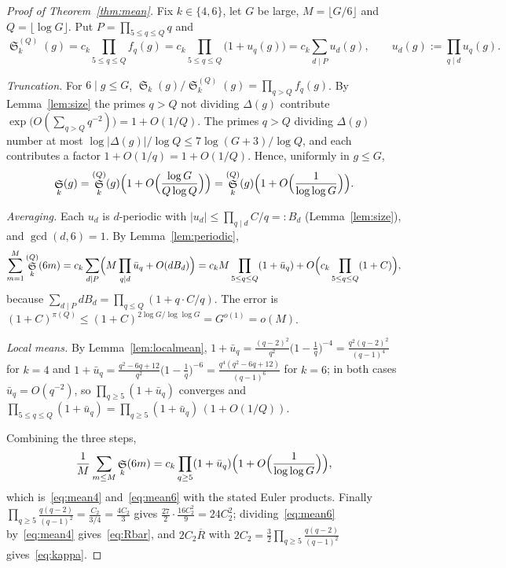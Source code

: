 \documentclass[11pt,a4paper]{article}
\theoremstyle{plain}
\theoremstyle{definition}
\theoremstyle{remark}
\newcommand{\Rbar}{\overline{R}}
\DeclareMathOperator{\Sing}{\mathfrak S}
\begin{document}
\begin{proof}[Proof of Theorem~\ref{thm:mean}]
Fix $k\in\{4,6\}$, let $G$ be large, $M=\lfloor G/6\rfloor$ and
$Q=\lfloor\log G\rfloor$.  Put $P=\prod_{5\le q\le Q}q$ and
\[
\Sing_k^{(Q)}(g)=c_k\prod_{5\le q\le Q}f_q(g)=c_k\prod_{5\le q\le Q}\bigl(1+u_q(g)\bigr)=c_k\sum_{d\mid P}u_d(g),
\qquad u_d(g):=\prod_{q\mid d}u_q(g).
\]

\emph{Truncation.}  For $6\mid g\le G$,
$\Sing_k(g)/\Sing_k^{(Q)}(g)=\prod_{q>Q}f_q(g)$.  By Lemma~\ref{lem:size}
the primes $q>Q$ not dividing $\Delta(g)$ contribute
$\exp\bigl(O(\sum_{q>Q}q^{-2})\bigr)=1+O(1/Q)$.  The primes $q>Q$ dividing
$\Delta(g)$ number at most $\log|\Delta(g)|/\log Q\le 7\log(G+3)/\log Q$,
and each contributes a factor $1+O(1/q)=1+O(1/Q)$.  Hence, uniformly in
$g\le G$,
\begin{equation}\label{eq:trunc}
\Sing_k(g)=\Sing_k^{(Q)}(g)\Bigl(1+O\Bigl(\frac{\log G}{Q\log Q}\Bigr)\Bigr)
=\Sing_k^{(Q)}(g)\Bigl(1+O\Bigl(\frac1{\log\log G}\Bigr)\Bigr).
\end{equation}

\emph{Averaging.}  Each $u_d$ is $d$-periodic with $|u_d|\le\prod_{q\mid d}C/q=:B_d$
(Lemma~\ref{lem:size}), and $\gcd(d,6)=1$.  By Lemma~\ref{lem:periodic},
\[
\sum_{m=1}^{M}\Sing_k^{(Q)}(6m)=c_k\sum_{d\mid P}\Bigl(M\prod_{q\mid d}\bar u_q+O(dB_d)\Bigr)
=c_kM\prod_{5\le q\le Q}(1+\bar u_q)+O\Bigl(c_k\prod_{5\le q\le Q}(1+C)\Bigr),
\]
because $\sum_{d\mid P}dB_d=\prod_{q\le Q}(1+q\cdot C/q)$.  The error is
$(1+C)^{\pi(Q)}\le(1+C)^{2\log G/\log\log G}=G^{o(1)}=o(M)$.

\emph{Local means.}  By Lemma~\ref{lem:localmean},
$1+\bar u_q=\frac{(q-2)^2}{q^2}\bigl(1-\frac1q\bigr)^{-4}=\frac{q^2(q-2)^2}{(q-1)^4}$
for $k=4$ and
$1+\bar u_q=\frac{q^2-6q+12}{q^2}\bigl(1-\frac1q\bigr)^{-6}=\frac{q^4(q^2-6q+12)}{(q-1)^6}$
for $k=6$; in both cases $\bar u_q=O(q^{-2})$, so
$\prod_{q\ge5}(1+\bar u_q)$ converges and
$\prod_{5\le q\le Q}(1+\bar u_q)=\prod_{q\ge5}(1+\bar u_q)\,(1+O(1/Q))$.

Combining the three steps,
\[
\frac1M\sum_{m\le M}\Sing_k(6m)=c_k\prod_{q\ge5}(1+\bar u_q)\Bigl(1+O\Bigl(\frac1{\log\log G}\Bigr)\Bigr),
\]
which is~\eqref{eq:mean4} and~\eqref{eq:mean6} with the stated Euler
products.  Finally $\prod_{q\ge5}\frac{q(q-2)}{(q-1)^2}=\frac{C_2}{3/4}=\frac{4C_2}3$
gives $\frac{27}2\cdot\frac{16C_2^2}9=24C_2^2$; dividing~\eqref{eq:mean6}
by~\eqref{eq:mean4} gives~\eqref{eq:Rbar}, and $2C_2\Rbar$ with
$2C_2=\frac32\prod_{q\ge5}\frac{q(q-2)}{(q-1)^2}$ gives~\eqref{eq:kappa}.
\end{proof}
\end{document}
